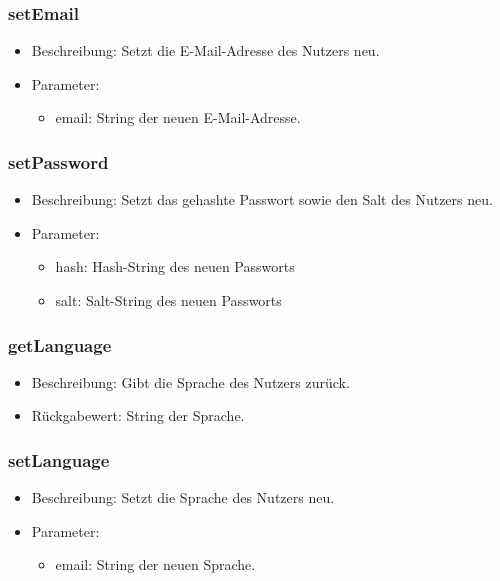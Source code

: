 \documentclass[a4paper]{scrreprt}
\begin{document}
	\subsubsection{setEmail}
	\begin{itemize}
		\item Beschreibung: Setzt die E-Mail-Adresse des Nutzers neu.
		\item Parameter:
		\begin{itemize}
			\item email: String der neuen E-Mail-Adresse.
		\end{itemize}
	\end{itemize}

	\subsubsection{setPassword}
	\begin{itemize}
		\item Beschreibung: Setzt das gehashte Passwort sowie den Salt des Nutzers neu.
		\item Parameter:
		\begin{itemize}
			\item hash: Hash-String des neuen Passworts
			\item salt: Salt-String des neuen Passworts
		\end{itemize}
	\end{itemize}

	\subsubsection{getLanguage}
	\begin{itemize}
		\item Beschreibung: Gibt die Sprache des Nutzers zurück.
		\item Rückgabewert: String der Sprache.
	\end{itemize}

	\subsubsection{setLanguage}
	\begin{itemize}
		\item Beschreibung: Setzt die Sprache des Nutzers neu.
		\item Parameter:
		\begin{itemize}
			\item email: String der neuen Sprache.
		\end{itemize}
	\end{itemize}
\end{document}
